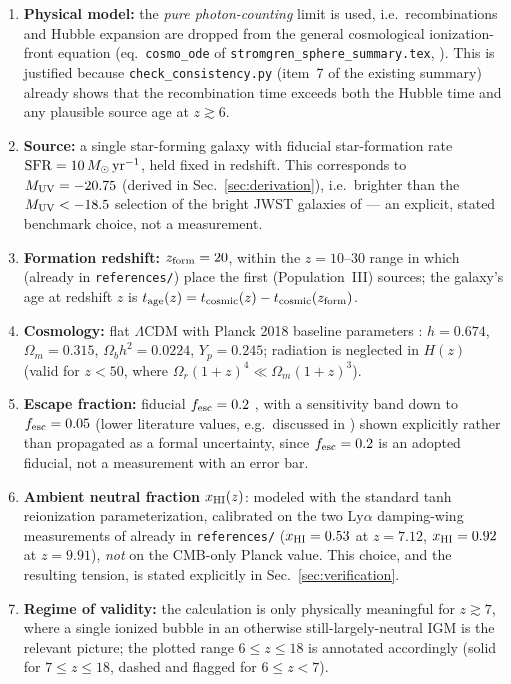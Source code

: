 \documentclass[11pt,a4paper]{article}
\newcommand{\Msun}{\,M_\odot}
\begin{document}
\begin{enumerate}
\item \textbf{Physical model:} the \emph{pure photon-counting} limit is used, i.e.\ recombinations and
      Hubble expansion are dropped from the general cosmological ionization-front equation
      (eq.~\texttt{cosmo\_ode} of \texttt{stromgren\_sphere\_summary.tex}, \citealt{Cen2000,ShapiroGiroux1987}).
      This is justified because \texttt{check\_consistency.py} (item~7 of the existing summary) already shows
      that the recombination time exceeds both the Hubble time and any plausible source age at $z\gtrsim6$.
\item \textbf{Source:} a single star-forming galaxy with fiducial star-formation rate
      $\mathrm{SFR}=10\Msun\,{\rm yr^{-1}}$, held fixed in redshift. This corresponds to
      $M_{\rm UV}=-20.75$ (derived in Sec.~\ref{sec:derivation}), i.e.\ brighter than the
      $M_{\rm UV}<-18.5$ selection of the bright JWST galaxies of \citet{Umeda2023} — an explicit,
      stated benchmark choice, not a measurement.
\item \textbf{Formation redshift:} $z_{\rm form}=20$, within the $z=10$--$30$ range in which
      \citet{Kitayama2004} (already in \texttt{references/}) place the first (Population~III) sources; the
      galaxy's age at redshift $z$ is $t_{\rm age}(z)=t_{\rm cosmic}(z)-t_{\rm cosmic}(z_{\rm form})$.
\item \textbf{Cosmology:} flat $\Lambda$CDM with Planck 2018 baseline parameters
      \citep{Planck2018VI}: $h=0.674$, $\Omega_m=0.315$, $\Omega_b h^2=0.0224$, $Y_p=0.245$; radiation is
      neglected in $H(z)$ (valid for $z<50$, where $\Omega_r(1+z)^4\ll\Omega_m(1+z)^3$).
\item \textbf{Escape fraction:} fiducial $f_{\rm esc}=0.2$ \citep{Robertson2015}, with a sensitivity band
      down to $f_{\rm esc}=0.05$ (lower literature values, e.g.\ discussed in \citealt{Chakraborty2025}) shown
      explicitly rather than propagated as a formal uncertainty, since $f_{\rm esc}=0.2$ is an adopted
      fiducial, not a measurement with an error bar.
\item \textbf{Ambient neutral fraction} $x_{\rm HI}(z)$: modeled with the standard tanh reionization
      parameterization, calibrated on the two Ly$\alpha$ damping-wing measurements of \citet{Umeda2023}
      already in \texttt{references/} ($x_{\rm HI}=0.53$ at $z=7.12$, $x_{\rm HI}=0.92$ at $z=9.91$), \emph{not}
      on the CMB-only Planck value. This choice, and the resulting tension, is stated explicitly in
      Sec.~\ref{sec:verification}.
\item \textbf{Regime of validity:} the calculation is only physically meaningful for $z\gtrsim7$, where a
      single ionized bubble in an otherwise still-largely-neutral IGM is the relevant picture; the plotted
      range $6\le z\le18$ is annotated accordingly (solid for $7\le z\le18$, dashed and flagged for
      $6\le z<7$).
\end{enumerate}
\end{document}
